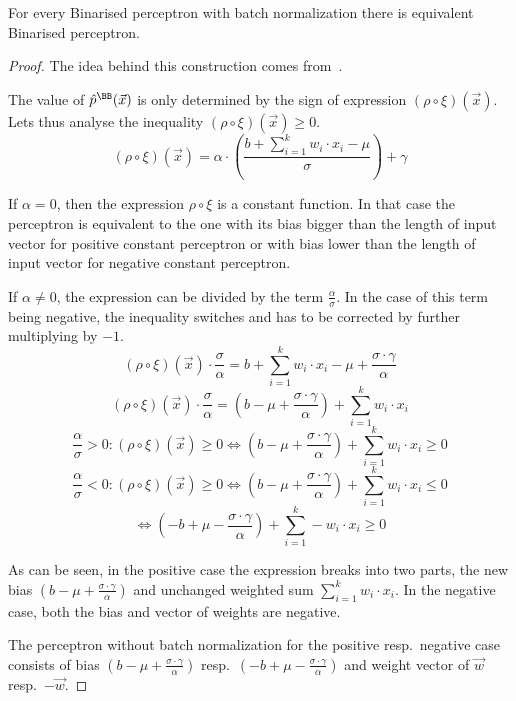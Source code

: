\begin{lemma}{For every Binarised perceptron with batch normalization there is equivalent Binarised perceptron.}
\begin{proof}
The idea behind this construction comes from~\cite{zhang2021bdd4bnn}.

The value of $\hat{p}^\BB(\vec x)$ is only determined by the sign of expression
$(\rho \circ \xi)(\vec x)$. Lets thus analyse the inequality
$(\rho\circ\xi)(\vec x) \geq 0$.
\begin{equation*}
	(\rho \circ \xi)(\vec x) = \alpha\cdot \left(\frac{
		b + \sum_{i=1}^k w_i\cdot x_i
	-\mu}{\sigma}\right) + \gamma
\end{equation*}

If $\alpha = 0$, then the expression $\rho\circ\xi$ is a constant function. In that case
the perceptron is equivalent to the one with its bias bigger than the length
of input vector for positive constant perceptron or with bias lower than the length
of input vector for negative constant perceptron.

If $\alpha \neq 0$, the expression can be divided by the term $\frac{\alpha}{\sigma}$.
In the case of this term being negative, the inequality switches and has to be corrected
by further multiplying by $-1$.
\begin{equation*}
	(\rho \circ \xi)(\vec x) \cdot \frac{\sigma}{\alpha} =
	b + \sum_{i=1}^k w_i\cdot x_i -\mu + \frac{\sigma\cdot \gamma}{\alpha}
\end{equation*}
\begin{equation*}
	(\rho \circ \xi)(\vec x) \cdot \frac{\sigma}{\alpha} =
	(b -\mu + \frac{\sigma\cdot \gamma}{\alpha}) + \sum_{i=1}^k w_i\cdot x_i
\end{equation*}
\begin{equation*}
	\frac{\alpha}{\sigma} > 0 :
		(\rho\circ\xi)(\vec x)\geq 0 \iff 
		(b -\mu + \frac{\sigma\cdot \gamma}{\alpha}) + \sum_{i=1}^k w_i\cdot x_i \geq 0
\end{equation*}
\begin{equation*}
	\frac{\alpha}{\sigma} < 0 :
		(\rho\circ\xi)(\vec x)\geq 0 \iff 
		(b -\mu + \frac{\sigma\cdot \gamma}{\alpha}) + \sum_{i=1}^k w_i\cdot x_i \leq 0
\end{equation*}
\begin{equation*}
	\iff (-b +\mu - \frac{\sigma\cdot \gamma}{\alpha}) + \sum_{i=1}^k -w_i\cdot x_i \geq 0
\end{equation*}

As can be seen, in the positive case the expression breaks into two parts, the new bias
$(b-\mu+\frac{\sigma\cdot \gamma}{\alpha})$
and unchanged weighted sum $\sum_{i=1}^k w_i\cdot x_i$.
In the negative case, both the bias and vector of weights are negative.

The perceptron without batch normalization for the positive resp.\ negative case
consists of bias $(b-\mu+\frac{\sigma\cdot \gamma}{\alpha})$
resp.\ $(-b+\mu-\frac{\sigma\cdot \gamma}{\alpha})$
and weight vector of $\vec w$ resp.\ $-\vec w$.
\end{proof}
\end{lemma}


